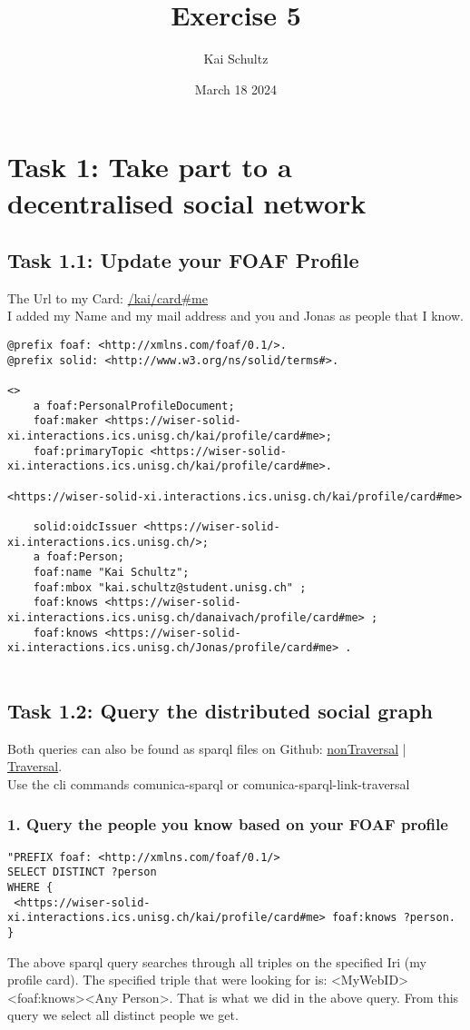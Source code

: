 \documentclass[11pt]{article}
\title{Exercise 5}
\author{Kai Schultz}
\date{March 18 2024} %
\begin{document}
\maketitle

\section*{Task 1: Take part to a decentralised social network}
\subsection*{Task 1.1: Update your FOAF Profile}
The Url to my Card: \href{https://wiser-solid-xi.interactions.ics.unisg.ch/kai/profile/card#me}{/kai/card\#me} \\
I added my Name and my mail address and you and Jonas as people that I know.
\begin{lstlisting}
@prefix foaf: <http://xmlns.com/foaf/0.1/>.
@prefix solid: <http://www.w3.org/ns/solid/terms#>.

<>
    a foaf:PersonalProfileDocument;
    foaf:maker <https://wiser-solid-xi.interactions.ics.unisg.ch/kai/profile/card#me>;
    foaf:primaryTopic <https://wiser-solid-xi.interactions.ics.unisg.ch/kai/profile/card#me>.

<https://wiser-solid-xi.interactions.ics.unisg.ch/kai/profile/card#me>
    
    solid:oidcIssuer <https://wiser-solid-xi.interactions.ics.unisg.ch/>;
    a foaf:Person;
    foaf:name "Kai Schultz";
    foaf:mbox "kai.schultz@student.unisg.ch" ;
    foaf:knows <https://wiser-solid-xi.interactions.ics.unisg.ch/danaivach/profile/card#me> ;
    foaf:knows <https://wiser-solid-xi.interactions.ics.unisg.ch/Jonas/profile/card#me> .
    
\end{lstlisting}

\subsection*{Task 1.2: Query the distributed social graph}
Both queries can also be found as sparql files on Github: \href{https://github.com/KaiTries/exercise-4/blob/main/sparqlNoTraversal.sparql}{nonTraversal} | \href{https://github.com/KaiTries/exercise-4/blob/main/sparqlLinkTraversal.sparql}{Traversal}.\\Use the cli commands comunica-sparql or comunica-sparql-link-traversal
\subsubsection*{1. Query the people you know based on your FOAF profile}
\begin{lstlisting}
"PREFIX foaf: <http://xmlns.com/foaf/0.1/>
SELECT DISTINCT ?person
WHERE {
 <https://wiser-solid-xi.interactions.ics.unisg.ch/kai/profile/card#me> foaf:knows ?person.
}
\end{lstlisting}
The above sparql query searches through all triples on the specified Iri (my profile card). The specified triple that were looking for is: \textless MyWebID\textgreater \textless foaf:knows\textgreater \textless Any Person\textgreater. That is what we did in the above query. From this query we select all distinct people we get.
\end{document}

